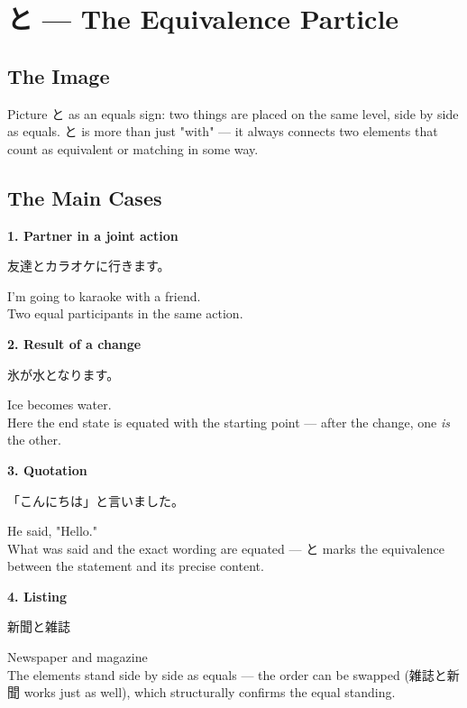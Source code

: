 \documentclass[12pt]{book}
\begin{document}
\chapter{と — The Equivalence Particle}

\section*{The Image}

Picture と as an equals sign: two things are placed on the same level, side by side as equals. と is more than just "with" — it always connects two elements that count as equivalent or matching in some way.

\section*{The Main Cases}

\textbf{1. Partner in a joint action}
\par\quad 友達とカラオケに行きます。\\
\par\quad I'm going to karaoke with a friend.\\

Two equal participants in the same action.

\textbf{2. Result of a change}
\par\quad 氷が水となります。\\
\par\quad Ice becomes water.\\

Here the end state is equated with the starting point — after the change, one \emph{is} the other.

\textbf{3. Quotation}
\par\quad 「こんにちは」と言いました。\\
\par\quad He said, "Hello."\\

What was said and the exact wording are equated — と marks the equivalence between the statement and its precise content.

\textbf{4. Listing}
\par\quad 新聞と雑誌\\
\par\quad Newspaper and magazine\\

The elements stand side by side as equals — the order can be swapped (雑誌と新聞 works just as well), which structurally confirms the equal standing.
\end{document}
